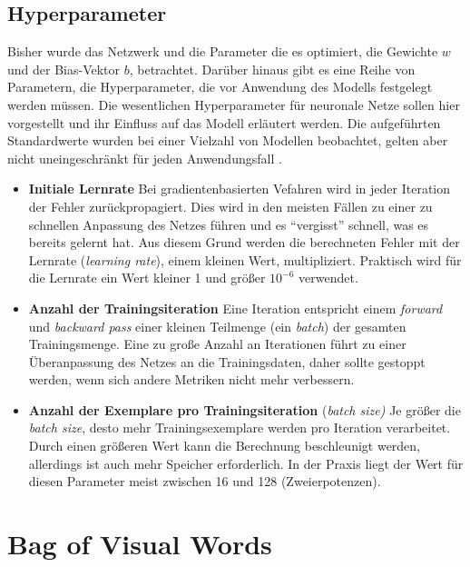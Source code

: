 \subsection{Hyperparameter}

Bisher wurde das Netzwerk und die Parameter die es optimiert, die Gewichte $w$ und der Bias-Vektor $b$, betrachtet. Darüber hinaus gibt es eine Reihe von Parametern, die Hyperparameter, die vor Anwendung des Modells festgelegt werden müssen. Die wesentlichen Hyperparameter für neuronale Netze sollen hier vorgestellt und ihr Einfluss auf das Modell erläutert werden. Die aufgeführten Standardwerte wurden bei einer Vielzahl von Modellen beobachtet, gelten aber nicht uneingeschränkt für jeden Anwendungsfall \cite{pda2012}. 

\begin{itemize}
	\item \textbf{Initiale Lernrate} Bei gradientenbasierten Vefahren wird in jeder Iteration der Fehler zurückpropagiert. Dies wird in den meisten Fällen zu einer zu schnellen Anpassung des Netzes führen und es \enquote{vergisst} schnell, was es bereits gelernt hat. Aus diesem Grund werden die berechneten Fehler mit der Lernrate (\textit{learning rate}), einem kleinen Wert, multipliziert. Praktisch wird für die Lernrate ein Wert kleiner 1 und größer $10^{-6}$ verwendet.
	\item \textbf{Anzahl der Trainingsiteration} Eine Iteration entspricht einem \textit{forward} und \textit{backward pass} einer kleinen Teilmenge (ein \textit{batch}) der gesamten Trainingsmenge. Eine zu große Anzahl an Iterationen führt zu einer Überanpassung des Netzes an die Trainingsdaten, daher sollte gestoppt werden, wenn sich andere Metriken nicht mehr verbessern.
	\item \textbf{Anzahl der Exemplare pro Trainingsiteration} (\textit{batch size)} Je größer die \textit{batch size}, desto mehr Trainingsexemplare werden pro Iteration verarbeitet. Durch einen größeren Wert kann die Berechnung beschleunigt werden, allerdings ist auch mehr Speicher erforderlich. In der Praxis liegt der Wert für diesen Parameter meist zwischen 16 und 128 (Zweierpotenzen). 
\end{itemize}

\section{Bag of Visual Words}


